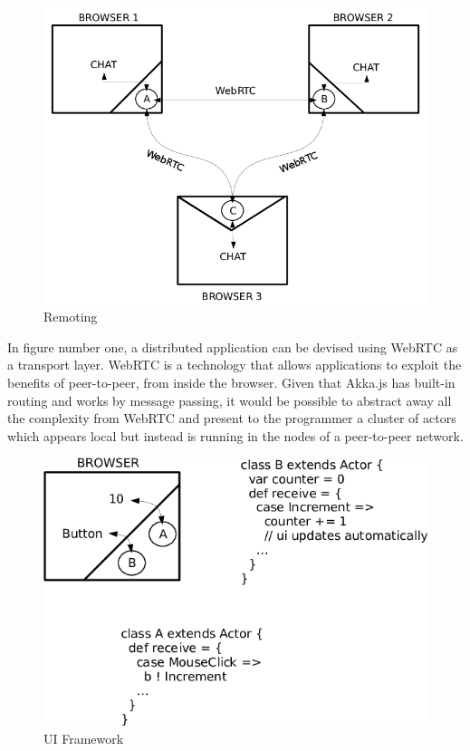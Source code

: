 \documentclass{sig-alternate}
\begin{document}
\begin{figure}
\centering
\includegraphics[scale=0.2]{1.png}
\caption{Remoting}
\label{fig:remoting}
\end{figure}

In figure number one, a distributed application can be devised using WebRTC as a transport layer.
WebRTC is a technology that allows applications to exploit the benefits of peer-to-peer, from inside
the browser. Given that Akka.js has built-in routing and works by message passing, it would be
possible to abstract away all the complexity from WebRTC and present to the programmer a cluster of
actors which appears local but instead is running in the nodes of a peer-to-peer network.

\begin{figure}
\centering
\includegraphics[scale=0.2]{2.png}
\caption{UI Framework}
\label{fig:ui}
\end{figure}
\end{document}
